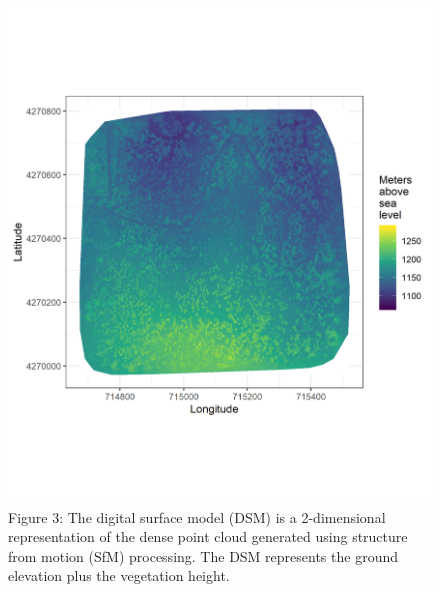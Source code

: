 \documentclass[]{article}
\begin{document}
\begin{figure}
\centering
\includegraphics{../../figures/eldo_3k_3_dsm.png}
\caption{Figure 3: The digital surface model (DSM) is a 2-dimensional
representation of the dense point cloud generated using structure from
motion (SfM) processing. The DSM represents the ground elevation plus
the vegetation height.}
\end{figure}
\end{document}
